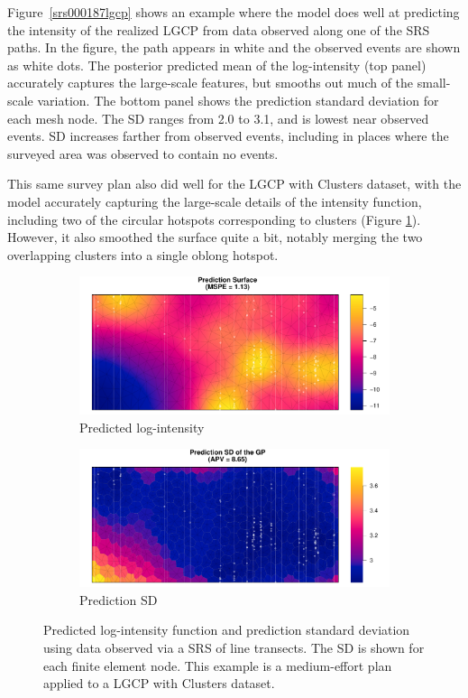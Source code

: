 \documentclass[review]{elsarticle}
\begin{document}
Figure~\ref{srs000187lgcp} shows an example where the model does well at predicting
the intensity of the realized LGCP from data observed along one of the SRS
paths. In the figure, the path appears in white and the observed events are
shown as white dots. The posterior predicted mean of the log-intensity (top
panel) accurately captures the large-scale features, but smooths out much of
the small-scale variation. The bottom panel shows the prediction standard
deviation for each mesh node. The SD ranges from 2.0 to 3.1, and is lowest
near observed events. SD increases farther from observed events, including
in places where the surveyed area was observed to contain no events.

This same survey plan also did well for the LGCP with Clusters dataset, with
the model accurately capturing the large-scale details of the intensity
function, including two of the circular hotspots corresponding to clusters
(Figure \ref{lambdasrs000187clust}). However, it also smoothed the surface
quite a bit, notably merging the two overlapping clusters into a single oblong
hotspot.

\begin{figure}

\begin{subfigure}{5in}
\includegraphics[width=5in]{../graphics/lambda-SRS000187-Cluster000004.pdf}
\caption{Predicted log-intensity}
\label{lambdasrs000187clust}
\end{subfigure}

\begin{subfigure}{5in}
\includegraphics[width=5in]{../graphics/lambdaSD-SRS000187-Cluster000004.pdf}
\caption{Prediction SD}
\label{sdsrs000187clust}
\end{subfigure}

\caption{Predicted log-intensity function and prediction standard deviation
using data observed via a SRS of line transects. The SD is shown for each
finite element node. This example is a medium-effort plan applied to a
LGCP with Clusters dataset.}
\label{srs000187clust}
\end{figure}
\end{document}
